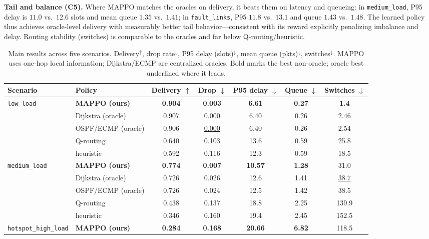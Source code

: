 \documentclass[conference,10pt]{IEEEtran}
\begin{document}
\textbf{Tail and balance (C5).} Where MAPPO matches the oracles on delivery, it beats them on latency and queueing: in \texttt{medium\_load}, P95 delay is $11.0$ vs.\ $12.6$ slots and mean queue $1.35$ vs.\ $1.41$; in \texttt{fault\_links}, P95 $11.8$ vs.\ $13.1$ and queue $1.43$ vs.\ $1.48$. The learned policy thus achieves oracle-level delivery with measurably better tail behavior---consistent with its reward explicitly penalizing imbalance and delay. Routing stability (switches) is comparable to the oracles and far below Q-routing/heuristic.

\begin{table}[t]
\centering
\caption{Main results across five scenarios. Delivery$^\uparrow$, drop rate$^\downarrow$, P95 delay (slots)$^\downarrow$, mean queue (pkts)$^\downarrow$, switches$^\downarrow$. MAPPO uses one-hop local information; Dijkstra/ECMP are centralized oracles. Bold marks the best non-oracle; oracle best underlined where it leads.}
\label{tab:main}
\small
\setlength{\tabcolsep}{4pt}
\begin{tabular}{llccccc}
\toprule
Scenario & Policy & Delivery $\uparrow$ & Drop $\downarrow$ & P95 delay $\downarrow$ & Queue $\downarrow$ & Switches $\downarrow$ \\
\midrule
\multirow{4}{*}{\texttt{low\_load}}
 & \textbf{MAPPO (ours)} & \textbf{0.904} & \textbf{0.003} & \textbf{6.61} & \textbf{0.27} & \textbf{1.4} \\
 & Dijkstra (oracle) & \underline{0.907} & \underline{0.000} & \underline{6.40} & \underline{0.26} & 2.46 \\
 & OSPF/ECMP (oracle) & 0.906 & \underline{0.000} & 6.40 & 0.26 & 2.54 \\
 & Q-routing & 0.640 & 0.103 & 13.6 & 0.59 & 25.8 \\
 & heuristic & 0.592 & 0.116 & 12.3 & 0.59 & 18.5 \\
\midrule
\multirow{4}{*}{\texttt{medium\_load}}
 & \textbf{MAPPO (ours)} & \textbf{0.774} & \textbf{0.007} & \textbf{10.57} & \textbf{1.28} & 31.0 \\
 & Dijkstra (oracle) & 0.726 & 0.026 & 12.6 & 1.41 & \underline{38.7} \\
 & OSPF/ECMP (oracle) & 0.726 & 0.024 & 12.5 & 1.42 & 38.5 \\
 & Q-routing & 0.438 & 0.137 & 18.8 & 2.25 & 139.9 \\
 & heuristic & 0.346 & 0.160 & 19.4 & 2.45 & 152.5 \\
\midrule
\multirow{4}{*}{\texttt{hotspot\_high\_load}}
 & \textbf{MAPPO (ours)} & \textbf{0.284} & \textbf{0.168} & \textbf{20.66} & \textbf{6.82} & 118.5 \\

\end{tabular}
\end{table}
\end{document}
